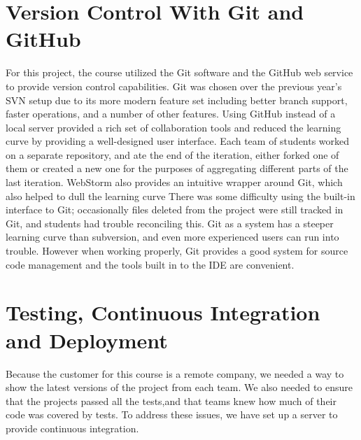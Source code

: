 \documentclass[12pt]{article}
\newcommand{\comment}[1]{{\bf \tt  {#1}}}
\newcommand{\emcomment}[1]{\textcolor{ForestGreen}{\comment{Elena: {#1}}}}
\begin{document}
\section{Version Control With Git and GitHub}\label{sec:git}
For this project, the course utilized the Git software and the GitHub web service to provide version control capabilities. Git was chosen over the previous year's SVN setup due to its more modern feature set including better branch support, faster operations, and a number of other features. Using GitHub instead of a local server provided a rich set of collaboration tools and reduced the learning curve by providing a well-designed user interface. Each team of students worked on a separate repository, and ate the end of the iteration, either forked one of them or created a new one for the purposes of aggregating different parts of the last iteration. WebStorm also provides an intuitive wrapper around Git, which also helped to dull the learning curve There was some difficulty using the built-in interface to Git; occasionally files deleted from the project were still tracked in Git, and students had trouble reconciling this. Git as a system has a steeper learning curve than subversion, and even more experienced users can run into trouble. However when working properly, Git provides a good system for source code management and the tools built in to the IDE are convenient.


\section{Testing, Continuous Integration and Deployment}\label{sec:CI}
Because the customer for this course is a remote company, we needed a way to show the latest versions of the project from each team. We also needed to ensure that the projects passed all the tests,and that teams knew how much of their code was covered by tests. To address these issues, we have set up a server to provide continuous integration.
\end{document}
